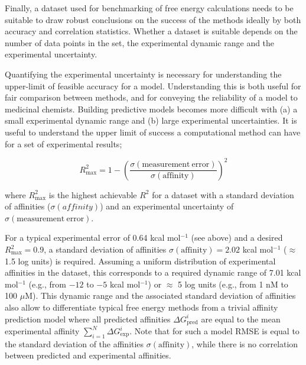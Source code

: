 \documentclass[9pt,bestpractices]{livecoms}
\begin{document}
Finally, a dataset used for benchmarking of free energy calculations needs to be suitable to draw robust conclusions on the success of the methods ideally by both accuracy and correlation statistics. Whether a dataset is suitable depends on the number of data points in the set, the experimental dynamic range and the experimental uncertainty. 

Quantifying the experimental uncertainty is necessary for understanding the upper-limit of feasible accuracy for a model.\cite{brown2009healthy} Understanding this is both useful for fair comparison between methods, and for conveying the reliability of a model to medicinal chemists\cite{griffen2020chemists}. Building predictive models becomes more difficult with (a) a small experimental dynamic range and (b) large experimental uncertainties. It is useful to understand the upper limit of success a computational method can have for a set of experimental results;

\begin{equation}\label{eqn:r2max}
    R^2_{\mathrm{max}} = 1 - \left(\frac{\sigma(\mathrm{measurement\   error})}{\sigma({\mathrm{affinity}})}\right) ^2
\end{equation}

where $R^2_{\mathrm{max}}$ is the highest achievable $R^2$ for a dataset with a standard deviation of affinities ($\sigma(affinity)$) and an experimental uncertainty of  $\sigma\mathrm{(measurement\ error)}$\cite{sheridan2020experimental}.

For a typical experimental error of 0.64 kcal mol$^{-1}$ (see above) and a desired $R^2_{\mathrm{max}} = 0.9$, a standard deviation of affinities $\sigma(\mathrm{affinity}) = 2.02 $ kcal mol$^{-1}$ ($\approx$1.5 log units) is required. Assuming a uniform distribution of experimental affinities in the dataset, this corresponds to a required dynamic range of 7.01 kcal mol$^{-1}$ (e.g., from $-12$ to $-5$ kcal mol$^{-1}$) or $\approx$ 5 log units (e.g., from 1 nM to 100 $\mu$M). This dynamic range and the associated standard deviation of affinities also allow to differentiate typical free energy methods from a trivial affinity prediction model where all predicted affinities $\Delta G_{\text{pred}}^i$ are equal to the mean experimental affinity $\sum_{i=1}^{N} \Delta G_{\text{exp}}^i$. Note that for such a model RMSE is equal to the standard deviation of the affinities $\sigma({\mathrm{affinity}})$, while there is no correlation between predicted and experimental affinities.
\end{document}
